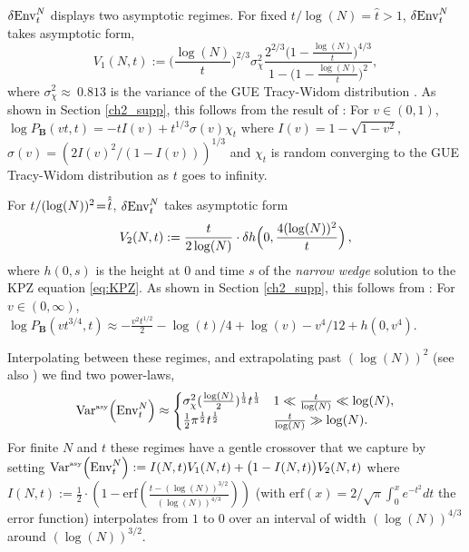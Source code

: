 $\var{\mathrm{Env}^{N}_t}$ displays two asymptotic regimes. For fixed $t/\log(N)=\hat{t}>1$, $\var{\mathrm{Env}^{N}_t}$ takes  asymptotic form,
\begin{equation}\label{eqlogN}
V_1(N, t):=\Big(\frac{\log(N)}{t}\Big)^{2/3} \sigma_{\chi}^2 \frac{2^{2/3}\big(1-\frac{\log(N)}{t}\big)^{4/3}}{1- \big(1- \frac{\log (N)}{t}\big)^2},
\end{equation}
where $\sigma_{\chi}^2\approx~0.813$ is the variance of the GUE Tracy-Widom distribution \cite{prahofer_universal_2000, tracy_level-spacing_1993}. As shown in  Section \ref{ch2_supp}, this follows from the result of \cite{barraquand_random-walk_2017}: For $v\in(0,1)$, $\log P_\mathbf{B}(vt,t)=-t I(v) + t^{1/3} \sigma(v)\chi_t$ where $I(v) = 1-\sqrt{1-v^2}$, $\sigma(v) = (2I(v)^2/(1-I(v)))^{1/3}$ and $\chi_t$ is random converging to the GUE Tracy-Widom distribution as $t$ goes to infinity.

For $t/(\log(N))^2\!=\!\hathat{t}$,  $\var{\mathrm{Env}^{N}_t}$ takes asymptotic form
\begin{equation}\label{eqlogNsq}
V_2(N, t):=\frac{t}{2\log(N)} \cdot \var{h\Big(0,\frac{4 (\log(N))^2}{t}\Big)},
\end{equation}
where $h(0,s)$ is the height at $0$ and time $s$ of the {\it narrow wedge} solution to the KPZ equation \eqref{eq:KPZ}. As shown in  Section \ref{ch2_supp}, this follows from \cite{barraquand_moderate_2020}: For $v\in (0,\infty)$,
$
\log P_\mathbf{B}(vt^{3/4},t) \approx -\frac{v^2t^{1/2}}{2} -\log(t)/4+\log(v) - v^4/12 + h(0,v^4).
$

Interpolating between these regimes, and extrapolating past $(\log(N))^2$ (see also \cite{krajenbrink_crossover_2022}) we find two power-laws,
\begin{equation}\label{eq:varqnt}
\mathrm{Var}^{\textrm{\tiny{asy}}}\!\left(\mathrm{Env}^{N}_t\right) \approx
    \begin{cases}
    \sigma_{\chi}^2 (\frac{\log(N)}{2})^{\frac{1}{3}} t^{\frac{1}{3}}& 1 \ll \frac{t}{\log(N)}\ll \log(N),\\
    \frac{1}{2}\pi^{\frac{1}{2}} t^{\frac{1}{2}}& \frac{t}{\log(N)}\gg \log(N).
    \end{cases}
\end{equation}
For finite $N$ and $t$ these regimes have a gentle crossover that we capture by setting
$
\mathrm{Var}^{\textrm{\tiny{asy}}}\!\left(\mathrm{Env}^{N}_t\right) := I(N,t) V_1(N, t)+\big(1-I(N,t)\big) V_2(N, t)
$
where $I(N,t) := \frac{1}{2} \cdot \left(1-\text{erf}\left(\frac{t-(\log(N))^{3/2}}{(\log(N))^{4/3}}\right)\right)$ (with  $\text{erf}(x)= 2/\sqrt{\pi} \int_{0}^{x} e^{-t^2}dt$ the error function) interpolates from $1$ to $0$ over an interval of width $(\log(N))^{4/3}$ around $(\log(N))^{3/2}$.


